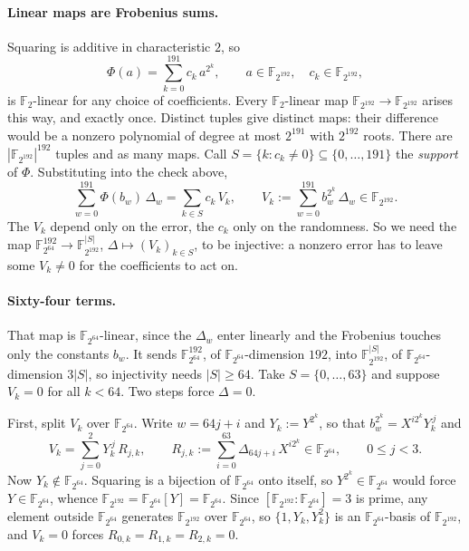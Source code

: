 \documentclass[11pt]{article}
\newcommand{\F}{\mathbb{F}}
\begin{document}
\paragraph{Linear maps are Frobenius sums.} Squaring is additive in characteristic $2$, so
\[
\Phi(a)=\sum_{k=0}^{191}c_k\,a^{2^k},\qquad a\in\F_{2^{192}},\quad c_k\in\F_{2^{192}},
\]
is $\F_2$-linear for any choice of coefficients. Every $\F_2$-linear map $\F_{2^{192}}\to\F_{2^{192}}$ arises this way, and exactly once. Distinct tuples give distinct maps: their difference would be a nonzero polynomial of degree at most $2^{191}$ with $2^{192}$ roots. There are $|\F_{2^{192}}|^{192}$ tuples and as many maps. Call $S=\{k:c_k\neq0\}\subseteq\{0,\dots,191\}$ the \emph{support} of $\Phi$. Substituting into the check above,
\begin{equation}
\sum_{w=0}^{191}\Phi(b_w)\,\Delta_w=\sum_{k\in S}c_k\,V_k,
\qquad
V_k:=\sum_{w=0}^{191}b_w^{2^k}\,\Delta_w\in\F_{2^{192}}.
\label{eq:pairing}
\end{equation}
The $V_k$ depend only on the error, the $c_k$ only on the randomness. So we need the map $\F_{2^{64}}^{192}\to\F_{2^{192}}^{|S|}$, $\Delta\mapsto(V_k)_{k\in S}$, to be injective: a nonzero error has to leave some $V_k\neq0$ for the coefficients to act on.

\paragraph{Sixty-four terms.} That map is $\F_{2^{64}}$-linear, since the $\Delta_w$ enter linearly and the Frobenius touches only the constants $b_w$. It sends $\F_{2^{64}}^{192}$, of $\F_{2^{64}}$-dimension $192$, into $\F_{2^{192}}^{|S|}$, of $\F_{2^{64}}$-dimension $3|S|$, so injectivity needs $|S|\ge64$. Take $S=\{0,\dots,63\}$ and suppose $V_k=0$ for all $k<64$. Two steps force $\Delta=0$.

First, split $V_k$ over $\F_{2^{64}}$. Write $w=64j+i$ and $Y_k:=Y^{2^k}$, so that $b_w^{2^k}=X^{i2^k}Y_k^{\,j}$ and
\[
V_k=\sum_{j=0}^{2}Y_k^{\,j}\,R_{j,k},
\qquad
R_{j,k}:=\sum_{i=0}^{63}\Delta_{64j+i}\,X^{i2^k}\in\F_{2^{64}},\qquad 0\le j<3.
\]
Now $Y_k\notin\F_{2^{64}}$. Squaring is a bijection of $\F_{2^{64}}$ onto itself, so $Y^{2^k}\in\F_{2^{64}}$ would force $Y\in\F_{2^{64}}$, whence $\F_{2^{192}}=\F_{2^{64}}[Y]=\F_{2^{64}}$. Since $[\F_{2^{192}}:\F_{2^{64}}]=3$ is prime, any element outside $\F_{2^{64}}$ generates $\F_{2^{192}}$ over $\F_{2^{64}}$, so $\{1,Y_k,Y_k^2\}$ is an $\F_{2^{64}}$-basis of $\F_{2^{192}}$, and $V_k=0$ forces $R_{0,k}=R_{1,k}=R_{2,k}=0$.
\end{document}

